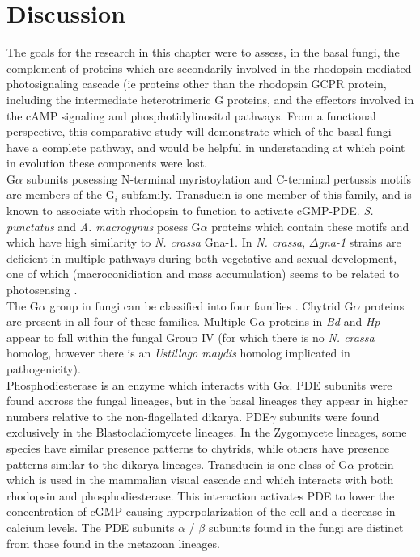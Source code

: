 \section{Discussion}
The goals for the research in this chapter were to assess, in the basal fungi, the complement of proteins which are secondarily involved in the rhodopsin-mediated photosignaling cascade (ie proteins other than the rhodopsin GCPR protein, including the intermediate heterotrimeric G proteins, and the effectors involved in the cAMP signaling and phosphotidylinositol pathways. From a functional perspective, this comparative study will demonstrate which of the basal fungi have a complete pathway, and would be helpful in understanding at which point in evolution these components were lost.\\
\indent G$\alpha$ subunits posessing N-terminal myristoylation and C-terminal pertussis motifs are members of the G$_{i}$ subfamily. Transducin is one member of this family, and is known to associate with rhodopsin to function to activate cGMP-PDE. \textit{S. punctatus} and \textit{A. macrogynus} posess G$\alpha$ proteins which contain these motifs and which have high similarity to \textit{N. crassa} Gna-1. In \textit{N. crassa}, \emph{$\Delta$gna-1} strains are deficient in multiple pathways during both vegetative and sexual development, one of which (macroconidiation and mass accumulation) seems to be related to photosensing \cite{Ivey1996}.\\
\indent The G$\alpha$ group in fungi can be classified into four families \cite{Bolker1998}. Chytrid G$\alpha$ proteins are present in all four of these families. Multiple G$\alpha$ proteins in \textit{Bd} and \textit{Hp} appear to fall within the fungal Group IV (for which there is no \textit{N. crassa} homolog, however there is an \textit{Ustillago maydis} homolog implicated in pathogenicity).\\
\indent Phosphodiesterase is an enzyme which interacts with G$\alpha$. PDE subunits were found accross the fungal lineages, but in the basal lineages they appear in higher numbers relative to the non-flagellated dikarya. PDE$\gamma$ subunits were found exclusively in the Blastocladiomycete lineages. In the Zygomycete lineages, some species have similar presence patterns to chytrids, while others have presence patterns similar to the dikarya lineages. Transducin is one class of G$\alpha$ protein which is used in the mammalian visual cascade and which interacts with both rhodopsin and phosphodiesterase. This interaction activates PDE to lower the concentration of cGMP causing hyperpolarization of the cell and a decrease in calcium levels. The PDE subunits $\alpha$ / $\beta$ subunits found in the fungi are distinct from those found in the metazoan lineages.\\
